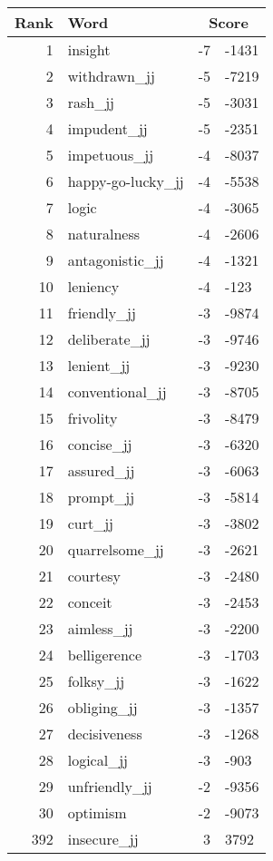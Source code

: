 \begin{longtable}[!htbp]{| rlr@{.}l |}
    \hline
    \textbf{Rank} & \textbf{Word} & \multicolumn{2}{c|}{\textbf{Score}} \\
    \hline
    \endhead
    1 & insight & -7 & -1431 \\
    2 & withdrawn\_jj & -5 & -7219 \\
    3 & rash\_jj & -5 & -3031 \\
    4 & impudent\_jj & -5 & -2351 \\
    5 & impetuous\_jj & -4 & -8037 \\
    6 & happy-go-lucky\_jj & -4 & -5538 \\
    7 & logic & -4 & -3065 \\
    8 & naturalness & -4 & -2606 \\
    9 & antagonistic\_jj & -4 & -1321 \\
    10 & leniency & -4 & -123 \\
    11 & friendly\_jj & -3 & -9874 \\
    12 & deliberate\_jj & -3 & -9746 \\
    13 & lenient\_jj & -3 & -9230 \\
    14 & conventional\_jj & -3 & -8705 \\
    15 & frivolity & -3 & -8479 \\
    16 & concise\_jj & -3 & -6320 \\
    17 & assured\_jj & -3 & -6063 \\
    18 & prompt\_jj & -3 & -5814 \\
    19 & curt\_jj & -3 & -3802 \\
    20 & quarrelsome\_jj & -3 & -2621 \\
    21 & courtesy & -3 & -2480 \\
    22 & conceit & -3 & -2453 \\
    23 & aimless\_jj & -3 & -2200 \\
    24 & belligerence & -3 & -1703 \\
    25 & folksy\_jj & -3 & -1622 \\
    26 & obliging\_jj & -3 & -1357 \\
    27 & decisiveness & -3 & -1268 \\
    28 & logical\_jj & -3 & -903 \\
    29 & unfriendly\_jj & -2 & -9356 \\
    30 & optimism & -2 & -9073 \\
    392 & insecure\_jj & 3 & 3792 \\

\end{longtable}
